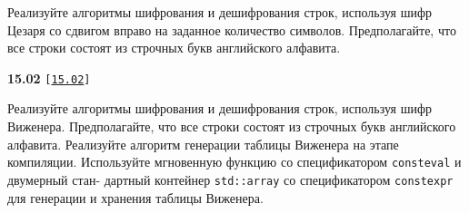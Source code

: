\documentclass[a4paper,12pt]{article}
\begin{document}
Реализуйте алгоритмы шифрования и дешифрования строк, используя шифр Цезаря со сдвигом вправо на заданное количество символов. Предполагайте, что все строки состоят из строчных букв английского алфавита.

\bigskip

{\large \textbf{15.02} \texttt{[\href{https://github.com/i-s-m-mipt/Education/blob/master/projects/examples/source/15.02.cpp}{\texttt{15.02}}]}}

\bigskip

Реализуйте алгоритмы шифрования и дешифрования строк, используя шифр Виженера. Предполагайте, что все строки состоят из строчных букв английского алфавита. Реализуйте алгоритм генерации таблицы Виженера на этапе компиляции. Используйте мгновенную функцию со спецификатором \lstinline{consteval} и двумерный стан- дартный контейнер \lstinline{std::array} со спецификатором \lstinline{constexpr} для генерации и хранения таблицы Виженера.  
\end{document}
